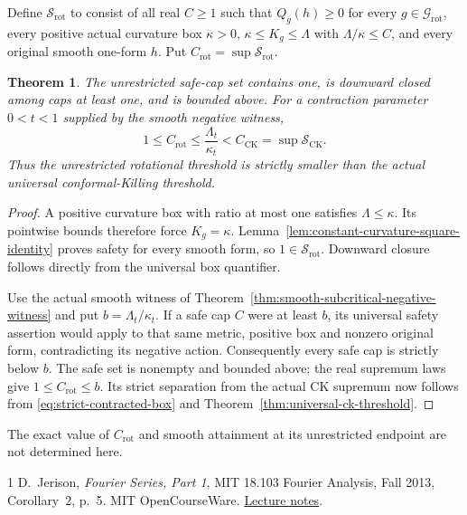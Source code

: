 \documentclass[11pt]{article}
\newtheorem{theorem}{Theorem}[section]
\begin{document}
Define $\mathcal S_{\mathrm{rot}}$ to consist of all real $C\geq1$ such
that $Q_g(h)\geq0$ for every $g\in\mathcal G_{\mathrm{rot}}$, every
positive actual curvature box
$\kappa>0$, $\kappa\leq K_g\leq\Lambda$ with $\Lambda/\kappa\leq C$,
and every original smooth one-form $h$. Put
$C_{\mathrm{rot}}=\sup\mathcal S_{\mathrm{rot}}$.

\begin{theorem}\label{thm:structural-strict-separation}
The unrestricted safe-cap set contains one, is downward closed among
caps at least one, and is bounded above. For a contraction parameter
$0<t<1$ supplied by the smooth negative witness,
\begin{equation}\label{eq:structural-strict-separation}
 1\leq C_{\mathrm{rot}}\leq\frac{\Lambda_t}{\kappa_t}
 <C_{\mathrm{CK}}=\sup\mathcal S_{\mathrm{CK}}.
\end{equation}
Thus the unrestricted rotational threshold is strictly smaller than the
actual universal conformal-Killing threshold.
\end{theorem}

\begin{proof}
A positive curvature box with ratio at most one satisfies
$\Lambda\leq\kappa$. Its pointwise bounds therefore force $K_g=\kappa$.
Lemma~\ref{lem:constant-curvature-square-identity} proves safety for every
smooth form, so $1\in\mathcal S_{\mathrm{rot}}$.
Downward closure follows directly from the universal box quantifier.

Use the actual smooth witness of
Theorem~\ref{thm:smooth-subcritical-negative-witness} and put
$b=\Lambda_t/\kappa_t$. If a safe cap $C$ were at least $b$, its universal
safety assertion would apply to that same metric, positive box and
nonzero original form, contradicting its negative action.
Consequently every safe cap is strictly below $b$.
The safe set is nonempty and bounded above; the real supremum laws give
$1\leq C_{\mathrm{rot}}\leq b$.
Its strict separation from the actual CK supremum now follows from
\eqref{eq:strict-contracted-box} and Theorem~\ref{thm:universal-ck-threshold}.
\end{proof}

The exact value of $C_{\mathrm{rot}}$ and smooth attainment at its
unrestricted endpoint are not determined here.


\begin{thebibliography}{1}
D.~Jerison, \emph{Fourier Series, Part 1}, MIT 18.103 Fourier Analysis,
Fall 2013, Corollary~2, p.~5. MIT OpenCourseWare.
\href{https://ocw.mit.edu/courses/18-103-fourier-analysis-fall-2013/1c196caa6307e0be46456cf6dc76b543_MIT18_103F13_fseries1.pdf}{Lecture notes}.
\end{thebibliography}
\end{document}
